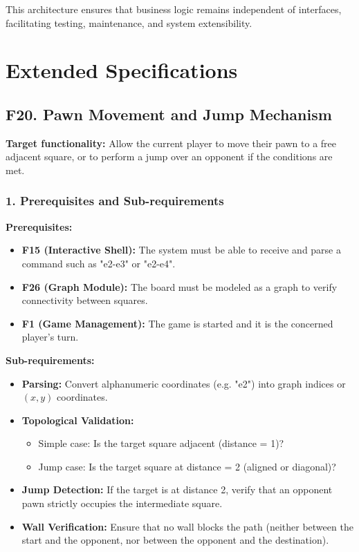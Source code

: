 \documentclass[a4paper]{article}
\begin{document}
This architecture ensures that business logic remains independent of
interfaces, facilitating testing, maintenance, and system extensibility.

\section*{Extended Specifications}

\subsection*{F20. Pawn Movement and Jump Mechanism}

\textbf{Target functionality:} Allow the current player to move their pawn to a free adjacent square, or to perform a jump over an opponent if the conditions are met.

\subsubsection*{1. Prerequisites and Sub-requirements}
\textbf{Prerequisites:}
\begin{itemize}
    \item \textbf{F15 (Interactive Shell):} The system must be able to receive and parse a command such as "e2-e3" or "e2-e4".
    \item \textbf{F26 (Graph Module):} The board must be modeled as a graph to verify connectivity between squares.
    \item \textbf{F1 (Game Management):} The game is started and it is the concerned player’s turn.
\end{itemize}

\textbf{Sub-requirements:}
\begin{itemize}
    \item \textbf{Parsing:} Convert alphanumeric coordinates (e.g. "e2") into graph indices or $(x,y)$ coordinates.
    \item \textbf{Topological Validation:}
    \begin{itemize}
        \item Simple case: Is the target square adjacent (distance = 1)?
        \item Jump case: Is the target square at distance = 2 (aligned or diagonal)?
    \end{itemize}
    \item \textbf{Jump Detection:} If the target is at distance 2, verify that an opponent pawn strictly occupies the intermediate square.
    \item \textbf{Wall Verification:} Ensure that no wall blocks the path (neither between the start and the opponent, nor between the opponent and the destination).
\end{itemize}
\end{document}
